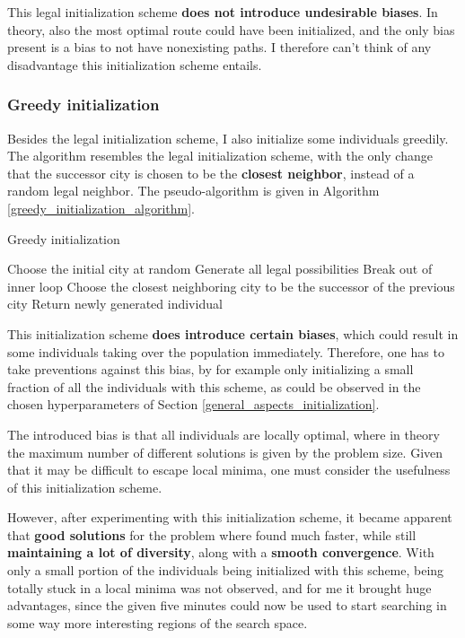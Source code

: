 \documentclass[a4paper,10pt]{article}
\begin{document}
This legal initialization scheme \textbf{does not introduce undesirable biases}. In theory, also the most optimal route could have been initialized, and the only bias present is a bias to not have nonexisting paths. I therefore can't think of any disadvantage this initialization scheme entails. 

\subsubsection{Greedy initialization}
\label{greedy_initialization}
Besides the legal initialization scheme, I also initialize some individuals greedily. The algorithm resembles the legal initialization scheme, with the only change that the successor city is chosen to be the \textbf{closest neighbor}, instead of a random legal neighbor. The pseudo-algorithm is given in Algorithm \ref{greedy_initialization_algorithm}.

\begin{algorithm}
\caption{Greedy initialization}\label{greedy_initialization_algorithm}
\begin{algorithmic}
\State Choose the initial city at random
\State Generate all legal possibilities
\State Break out of inner loop
\EndIf
\State Choose the closest neighboring city to be the successor of the previous city
\EndWhile
{}
\State Return newly generated individual
\EndIf
\EndWhile
\end{algorithmic}
\end{algorithm}

This initialization scheme \textbf{does introduce certain biases}, which could result in some individuals taking over the population immediately. Therefore, one has to take preventions against this bias, by for example only initializing a small fraction of all the individuals with this scheme, as could be observed in the chosen hyperparameters of Section \ref{general_aspects_initialization}.

The introduced bias is that all individuals are locally optimal, where in theory the maximum number of different solutions is given by the problem size. Given that it may be difficult to escape local minima, one must consider the usefulness of this initialization scheme.

However, after experimenting with this initialization scheme, it became apparent that \textbf{good solutions} for the problem where found much faster, while still \textbf{maintaining a lot of diversity}, along with a \textbf{smooth convergence}. With only a small portion of the individuals being initialized with this scheme, being totally stuck in a local minima was not observed, and for me it brought huge advantages, since the given five minutes could now be used to start searching in some way more interesting regions of the search space.
\end{document}
